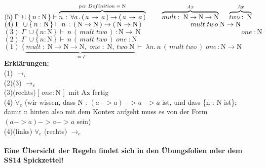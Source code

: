 \documentclass{article}
\begin{document}
	\underline{
		$(5)\;
			\Gamma \;\cup \{\,n:\mathrm{N}\,\} \vdash
			\overbrace{
			n\,:\,\forall a\,.\,(\,a\,\rightarrow\,a\,)\rightarrow (\,a\,\rightarrow \,a\,)
			}^{per\;Definition\; =\;\mathrm{N}}
			\hspace{8mm}
			\overbrace{
			mult:\;\mathrm{N}\rightarrow \mathrm{N}\rightarrow \mathrm{N}
			}^{Ax}
			\hspace{5mm}
			\overbrace{
			two:\;\mathrm{N}
			}^{Ax}
		$
	}\\
	\underline{
		$(4)\;
			\Gamma \;\cup \{\,n:\mathrm{N}\,\} \vdash 
			n\,:\,(\,\mathrm{N}\rightarrow \mathrm{N}\,)
			\rightarrow (\,\mathrm{N}\rightarrow \mathrm{N}\,)
			\hspace{25mm}
			mult\;two\;\mathrm{N}\rightarrow \mathrm{N}
		$
	}\\
	\underline{
	$	(3)\;
		\Gamma \; \cup \{\,n:\mathrm{N}\,\}\,
		\vdash \, n\,(\,mult\;two\,)\,: \mathrm{N}\rightarrow\,\mathrm{N}
		\hspace{6cm}
		\;one\; : \mathrm{N} 
	$
	}\\
	\underline{
	$(2)\;
		\Gamma \; \cup \{\,n:\mathrm{N}\,\}\,
		\vdash \, n\,(\,mult\;two\,)\;one\; : \mathrm{N}
	$\hspace{48mm}}
	\\
	$	(1)\;
	\{ 
		\underbrace{
			\,mult\;:\;
			\mathrm{N}\rightarrow\mathrm{N}\rightarrow\mathrm{N},\;
			one\; : \; \mathrm{N},\,two\;\mathrm{N}\,
		}_{:=\Gamma}	
	\vdash \; \lambda n.\,n\,(\, mult \; two\,)\;one\,:\mathrm{N}\rightarrow\mathrm{N}
	$		
	\\
	\textbf{Erkl\"arungen:}\\
	(1) $\rightarrow_{i}$\\
	(2)(3) $\rightarrow_e$\\
	(3)(rechts)$[\,one:\mathrm{N}\,]$ mit Ax fertig\\
	(4) $\forall _e$ (wir wissen, dass N : $(a->a)->a->a$ ist, und dass \{n : N ist\}; damit n hinten also mit dem Kontex aufgeht muss es von der Form $(a->a)->a->a$ sein)\\
	(4)(links) $\forall_{e}$ (rechts) $\rightarrow_e$\\\\
	\textbf{Eine \"Ubersicht der Regeln findet sich in den \"Ubungsfolien oder dem SS14 Spickzettel!}
	
\end{document}

